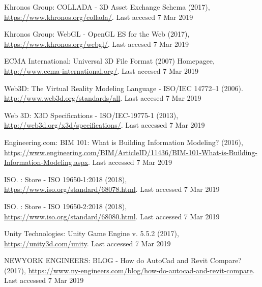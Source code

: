 \documentclass[runningheads]{llncs}
\begin{document}
%
%
%
% 
% 
%
\begin{thebibliography}{8}
Khronos Group: COLLADA - 3D Asset Exchange Schema (2017), 
\url{https://www.khronos.org/collada/}. Last accesed 7 Mar 2019

Khronos Group: WebGL - OpenGL ES for the Web (2017), 
\url{https://www.khronos.org/webgl/}. Last accesed 7 Mar 2019

ECMA International: Universal 3D File Format (2007) Homepagee, 
\url{http://www.ecma-international.org/}. Last accesed 7 Mar 2019

Web3D: The Virtual Reality Modeling Language - ISO/IEC 14772–1 (2006).
\url{http://www.web3d.org/standards/all}. Last accesed 7 Mar 2019

Web 3D: X3D Specifications - ISO/IEC-19775-1 (2013), 
\url{http://web3d.org/x3d/specifications/}. Last accessed 7 Mar 2019

Engineering.com: BIM 101: What is Building Information Modeling? (2016), \url{https://www.engineering.com/BIM/ArticleID/11436/BIM-101-What-is-Building-Information-Modeling.aspx}. Last accessed 7 Mar 2019

ISO. : Store - ISO 19650-1:2018 (2018), \url{https://www.iso.org/standard/68078.html}. 
Last accessed 7 Mar 2019

ISO. : Store - ISO 19650-2:2018 (2018), \url{https://www.iso.org/standard/68080.html}. 
Last accessed 7 Mar 2019

Unity Technologies: Unity Game Engine v. 5.5.2 (2017), 
\url{https://unity3d.com/unity}. Last accessed 7 Mar 2019

NEWYORK ENGINEERS: BLOG - How do AutoCad and Revit Compare? (2017), 
\url{https://www.ny-engineers.com/blog/how-do-autocad-and-revit-compare}. 
Last accessed 7 Mar 2019


\end{thebibliography}
\end{document}
